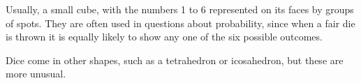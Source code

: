 Usually, a small cube, with the numbers 1 to 6 represented on
its faces by groups of spots. They are often used in questions about probability, since when a fair die is thrown it is equally likely to show any one of the six possible outcomes. 

\par
 Dice come in other shapes, such as a tetrahedron or icosahedron, but these are more unusual. 